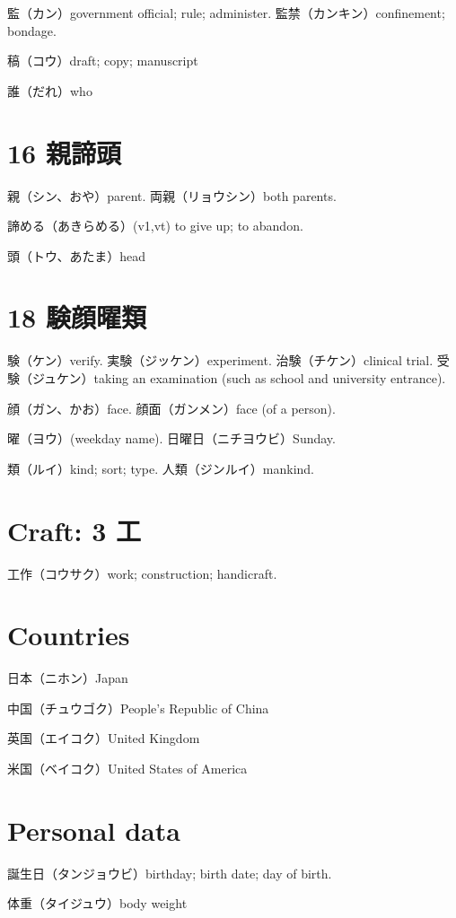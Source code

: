 監（カン）government official; rule; administer.
監禁（カンキン）confinement; bondage.

稿（コウ）draft; copy; manuscript

誰（だれ）who

\section{16 親諦頭}

親（シン、おや）parent.
両親（リョウシン）both parents.

諦める（あきらめる）(v1,vt)
to give up; to abandon.

頭（トウ、あたま）head

\section{18 験顔曜類}

験（ケン）verify.
実験（ジッケン）experiment.
治験（チケン）clinical trial.
受験（ジュケン）taking an examination (such as school and university entrance).

顔（ガン、かお）face.
顔面（ガンメン）face (of a person).

曜（ヨウ）(weekday name).
日曜日（ニチヨウビ）Sunday.

類（ルイ）kind; sort; type.
人類（ジンルイ）mankind.

\section{Craft: 3 工}

工作（コウサク）work; construction; handicraft.

\section{Countries}

日本（ニホン）Japan

中国（チュウゴク）People's Republic of China

英国（エイコク）United Kingdom

米国（ベイコク）United States of America

\section{Personal data}

誕生日（タンジョウビ）birthday; birth date; day of birth.

体重（タイジュウ）body weight

